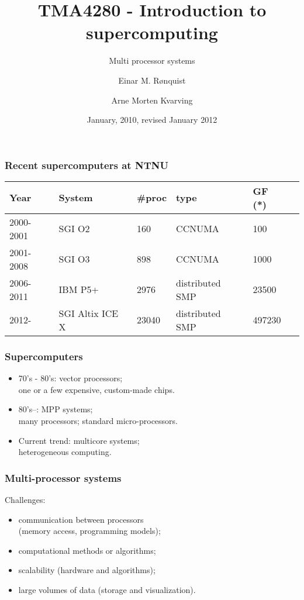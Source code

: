 \documentclass{beamer}
\title{TMA4280 - Introduction to supercomputing}
\subtitle{Multi processor systems}
\author{Einar M. R{\o}nquist \and Arne Morten Kvarving}
\institute{NTNU \and Sintef ICT}
\date{January, 2010, revised January 2012}
\begin{document}
\maketitle

\begin{frame}\frametitle{Recent supercomputers at NTNU}

\begin{tabular}{|l|l|l|l|l|l|}
\hline
Year & System & \#proc & type & GF (*)\\
\hline
2000-2001 & SGI O2 & 160 & CCNUMA & 100\\
2001-2008 & SGI O3 & 898 & CCNUMA & 1000\\
2006-2011 & IBM P5+ & 2976 & distributed SMP & 23500\\
2012-     & SGI Altix ICE X & 23040 & distributed SMP & 497230 \\
\hline
\end{tabular}
\end{frame}

\begin{frame}\frametitle{Supercomputers}

\begin{itemize}
\item 70's - 80's: vector processors; \\
one or a few expensive, custom-made chips.
\vspace{.2cm}
\item 80's--: MPP systems; \\
many processors; standard micro-processors.
\vspace{.2cm}
\item Current trend: multicore systems; \\
heterogeneous computing. 
\end{itemize}
\end{frame}

\begin{frame}\frametitle{Multi-processor systems}
Challenges: 
\vspace{.5cm}

\begin{itemize}
\item communication between processors \\
(memory access, programming models); 
\vspace{.2cm}
\item computational methods or algorithms;
\vspace{.2cm}
\item scalability (hardware and algorithms); 
\vspace{.2cm}
\item large volumes of data (storage and visualization). 
\end{itemize}
\end{frame}
\end{document}
